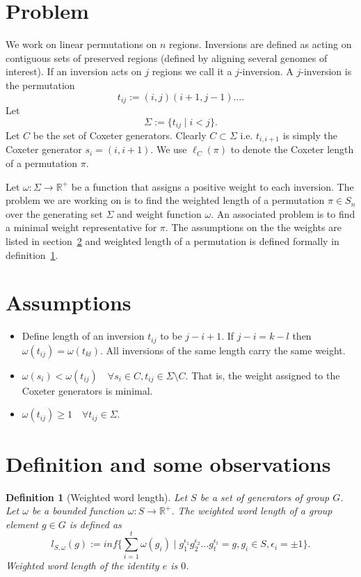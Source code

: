 \documentclass{article}
\newtheorem{definition}{Definition}
\newcommand{\newl}{\ell}
\begin{document}
\section{Problem}
\label{sec:problem}
We work on linear permutations on $n$ regions. Inversions are defined as acting on contiguous sets of preserved regions (defined by aligning several genomes of interest). If an inversion acts on $j$ regions we call it a $j$-inversion. A $j$-inversion is the permutation
\[t_{ij} := (i, j)(i+1, j-1) \hdots.\]
Let 
\[\Sigma := \{ t_{ij} \mid i < j \}.\]
Let $C$ be the set of Coxeter generators. Clearly $C \subset \Sigma$ i.e. $t_{i, i+1}$ is simply the Coxeter generator $s_i = (i, i + 1)$.  We use $\newl_C(\pi)$ to denote the Coxeter length of a permutation $\pi$.

Let $\omega : \Sigma \rightarrow \mathbb{R}^+$ be a function that assigns a positive weight to each inversion.
The problem we are working on is to find the weighted length of a permutation $\pi \in S_n$ over the generating set $\Sigma$ and weight function $\omega$. An associated problem is to find a minimal weight representative for $\pi$. The assumptions on the the weights are listed in section~\ref{sec:assm} and weighted length of a permutation is defined formally in definition~\ref{def:wwl}.

\section{Assumptions} \label{sec:assm}
\begin{itemize}
\item Define length of an inversion $t_{ij}$ to be $j - i + 1$. If $j -i = k - l$ then $\omega(t_{ij}) = \omega(t_{kl})$. All inversions of the same length carry the same weight.
\item $\omega(s_i) < \omega(t_{ij}) \quad \forall s_i \in C, t_{ij} \in \Sigma \setminus C$. That is, the weight assigned to the Coxeter generators is minimal.
\item $\omega(t_{ij}) \geq 1 \quad \forall t_{ij} \in \Sigma$.

\end{itemize}

\section{Definition and some observations}
\begin{definition}[Weighted word length]
\label{def:wwl}
Let $S$ be a set of generators of group $G$. Let $\omega$ be a bounded function $\omega:S \rightarrow \mathbb{R}^+$. The weighted word length of a group element $g \in G$ is defined as 
\[l_{S,\omega}(g):=inf \{\sum_{i=1}^{t}{\omega(g_i)} \mid g_1^{\epsilon_1}g_2^{\epsilon_2} \hdots g_t^{\epsilon_t}=g, g_i \in S, \epsilon_i = \pm 1\}.\]
Weighted word length of the identity $e$ is $0$. 
\end{definition}
\end{document}
